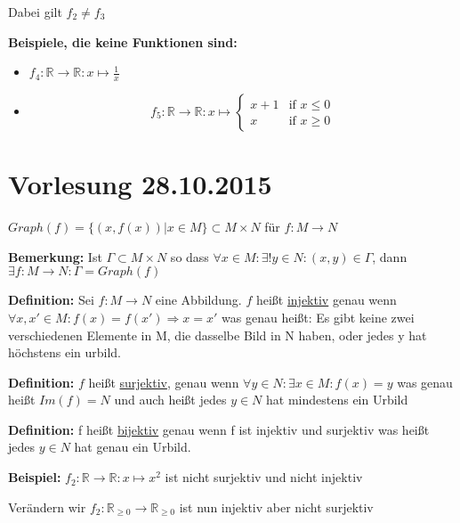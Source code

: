 \documentclass[pdftex,12pt,a4paper,fleqn]{scrartcl}
\begin{document}
Dabei gilt $f_2 \neq f_3$

\textbf{Beispiele, die keine Funktionen sind:}
\begin{itemize}
    \item $f_4: \mathbb{R} \rightarrow \mathbb{R}: x \mapsto \frac{1}{x}$
    \item \begin{equation*}f_5: \mathbb{R} \rightarrow \mathbb{R}: x \mapsto \begin{cases} x+1 &\mbox{if } x \leq 0 \\ 
                  x & \mbox{if } x \geq 0 \end{cases}\end{equation*}
\end{itemize}





\newpage
\section{Vorlesung 28.10.2015} %
\label{sec:vorlesung_28_10_2015}

$Graph(f) = \{(x,f(x)) | x \in M\} \subset M \times N$ für $f: M \rightarrow N$

\textbf{Bemerkung:} Ist $\Gamma \subset M \times N$ so dass $\forall x \in M: \exists! y \in N: (x,y) \in \Gamma $, dann $\exists f: M \rightarrow N : \Gamma = Graph(f)$

\textbf{Definition:} Sei $f: M \rightarrow N$ eine Abbildung. $f$ heißt \underline{injektiv} genau wenn $\forall x,x' \in M: f(x) = f(x') \Rightarrow x = x'$ was genau heißt: Es gibt keine zwei verschiedenen Elemente in M, die dasselbe Bild in N haben, oder jedes y hat höchstens ein urbild.

\textbf{Definition:} $f$ heißt \underline{surjektiv}, genau wenn $\forall y \in N: \exists x \in M: f(x) = y$ was genau heißt $Im(f) = N $ und auch heißt jedes $y \in N $ hat mindestens ein Urbild

\textbf{Definition:} f heißt \underline{bijektiv} genau wenn f ist injektiv und surjektiv was heißt jedes $y \in N$ hat genau ein Urbild.


\textbf{Beispiel:} $f_2: \mathbb{R} \rightarrow \mathbb{R}: x \mapsto x^2$ ist nicht surjektiv und nicht injektiv

Verändern wir $f_2: \mathbb{R}_{\geq0} \rightarrow \mathbb{R}_{\geq0}$ ist nun injektiv aber nicht surjektiv
\end{document}
